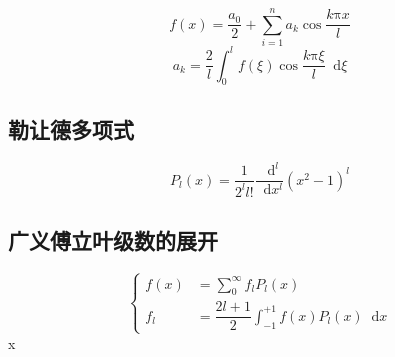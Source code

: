 \documentclass{article}
\newcommand*{\md}{\mathop{}\!\mathrm{d}}
\begin{document}
\begin{equation*}
  f(x) = \dfrac{a_{0}}{2} + \sum\limits_{i=1}^{n}a_{k} \cos \dfrac{k \mathrm{\pi} x}{l} 
\end{equation*}
\begin{equation*}
  a_{k} = \dfrac{2}{l} \int_{0}^{l} f(\xi) \cos \dfrac{k \mathrm{\pi} \xi}{l} \md \xi 
\end{equation*}
\subsection{勒让德多项式}

\begin{equation*}
  \label{eq:6}
  P_{l} \left( x \right) = \dfrac{1}{2^{l} l!} \dfrac{\md^{l}}{\md x^{l}} \left( x^{2} - 1 \right)^{l}
\end{equation*}

\subsection{广义傅立叶级数的展开}

\begin{equation*}
  \label{eq:7}
  \left\{
    \begin{aligned}
      f(x) &= \sum\limits_{0}^{\infty} f_{l} P_{l}(x) \\
      f_{l} &= \dfrac{2l+1}{2} \int_{-1}^{+1} f(x) P_{l}(x) \md x
    \end{aligned}
  \right.
\end{equation*}x
\end{document}
